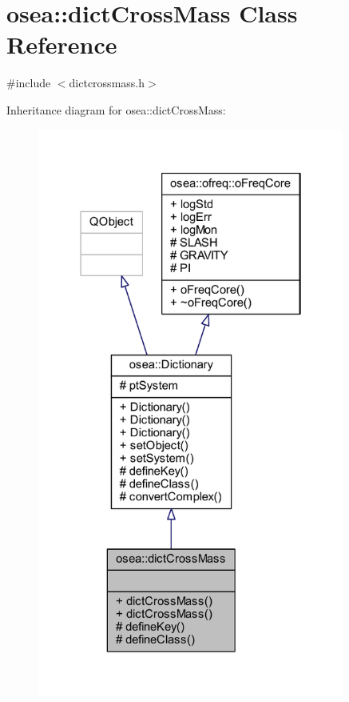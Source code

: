 \hypertarget{classosea_1_1dict_cross_mass}{\section{osea\-:\-:dict\-Cross\-Mass Class Reference}
\label{classosea_1_1dict_cross_mass}
}


{\ttfamily \#include $<$dictcrossmass.\-h$>$}



Inheritance diagram for osea\-:\-:dict\-Cross\-Mass\-:
\nopagebreak
\begin{figure}[H]
\begin{center}
\leavevmode
\includegraphics[width=286pt]{classosea_1_1dict_cross_mass__inherit__graph}
\end{center}
\end{figure}

